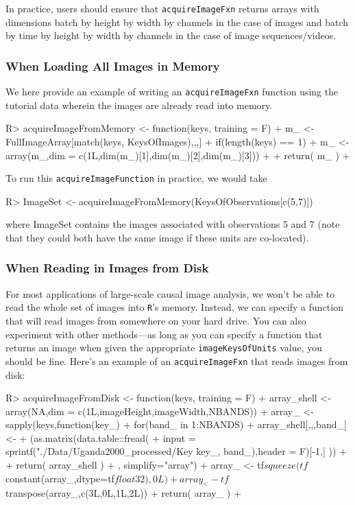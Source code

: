 \documentclass[nojss,shortnames]{jss} %
\begin{document}
In practice, users should ensure that \texttt{acquireImageFxn} returns arrays with dimensions batch by height by width by channels in the case of images and batch by time by height by width by channels in the case of image sequences/videos. 

\subsubsection{When Loading All Images in Memory}
We here provide an example of writing an \texttt{acquireImageFxn} function using the tutorial data wherein the images are already read into memory. 
\begin{CodeChunk}
\begin{CodeInput}
R> acquireImageFromMemory <- function(keys, training = F){
+  m_ <- FullImageArray[match(keys, KeysOfImages),,,]
+  if(length(keys) == 1){
+    m_ <- array(m_,dim = c(1L,dim(m_)[1],dim(m_)[2],dim(m_)[3]))
+  }
+  return( m_ )
+}
\end{CodeInput}
\end{CodeChunk}

To run this \texttt{acquireImageFunction} in practice, we would take 
\begin{CodeChunk}
\begin{CodeInput}
R> ImageSet <- acquireImageFromMemory(KeysOfObservations[c(5,7)])
\end{CodeInput}
\end{CodeChunk}
where ImageSet contains the images associated with observations 5 and 7 (note that they could both have the same image if these units are co-located). 

\subsubsection{When Reading in Images from Disk}
For most applications of large-scale causal image analysis, we won't be able to read the whole set of images into \texttt{R}'s memory. Instead, we can specify a function that will read images from somewhere on your hard drive. You can also experiment with other methods---as long as you can specify a function that returns an image when given the appropriate \texttt{imageKeysOfUnits} value, you should be fine. Here's an example of an \texttt{acquireImageFxn} that reads images from disk:

\begin{CodeChunk}
\begin{CodeInput}
R> acquireImageFromDisk <- function(keys, training = F){
+  array_shell <- array(NA,dim = c(1L,imageHeight,imageWidth,NBANDS))
+  array_ <- sapply(keys,function(key_){
+    for(band_ in 1:NBANDS){
+      array_shell[,,,band_] <-
+        (as.matrix(data.table::fread(
+          input = sprintf("./Data/Uganda2000_processed/Key%
                          key_,
                          band_),header = F)[-1,] ))
+    }
+    return( array_shell )
+  }, simplify="array")
+  array_ <- tf$squeeze(tf$constant(array_,dtype=tf$float32),0L)
+  array_ <- tf$transpose(array_,c(3L,0L,1L,2L))
+  return( array_ )
+}
\end{CodeInput}
\end{CodeChunk}
\end{document}
